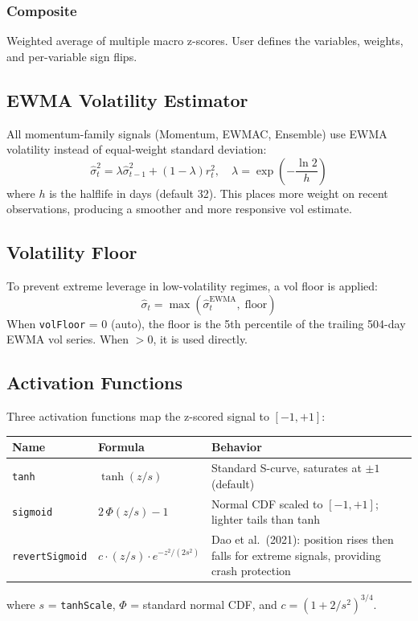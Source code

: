 \documentclass[11pt,a4paper]{article}
\begin{document}
\subsubsection{Composite}
Weighted average of multiple macro z-scores. User defines the variables, weights, and per-variable sign flips.

\subsection{EWMA Volatility Estimator}
All momentum-family signals (Momentum, EWMAC, Ensemble) use EWMA volatility instead of equal-weight standard deviation:
\begin{equation}
\hat{\sigma}^2_t = \lambda \hat{\sigma}^2_{t-1} + (1 - \lambda) r_t^2, \quad \lambda = \exp\left(-\frac{\ln 2}{h}\right)
\end{equation}
where $h$ is the halflife in days (default 32). This places more weight on recent observations, producing a smoother and more responsive vol estimate.

\subsection{Volatility Floor}
To prevent extreme leverage in low-volatility regimes, a vol floor is applied:
\begin{equation}
\hat{\sigma}_t = \max(\hat{\sigma}_t^{\text{EWMA}},\; \text{floor})
\end{equation}
When \texttt{volFloor} = 0 (auto), the floor is the 5th percentile of the trailing 504-day EWMA vol series. When $> 0$, it is used directly.

\subsection{Activation Functions}
Three activation functions map the z-scored signal to $[-1, +1]$:

\begin{center}
\begin{tabularx}{\textwidth}{l l X}
\toprule
\textbf{Name} & \textbf{Formula} & \textbf{Behavior} \\
\midrule
\texttt{tanh} & $\tanh(z/s)$ & Standard S-curve, saturates at $\pm 1$ (default) \\
\texttt{sigmoid} & $2\,\Phi(z/s) - 1$ & Normal CDF scaled to $[-1,+1]$; lighter tails than tanh \\
\texttt{revertSigmoid} & $c \cdot (z/s) \cdot e^{-z^2/(2s^2)}$ & Dao et al.\ (2021): position rises then falls for extreme signals, providing crash protection \\
\bottomrule
\end{tabularx}
\end{center}
where $s$ = \texttt{tanhScale}, $\Phi$ = standard normal CDF, and $c = (1 + 2/s^2)^{3/4}$.
\end{document}
